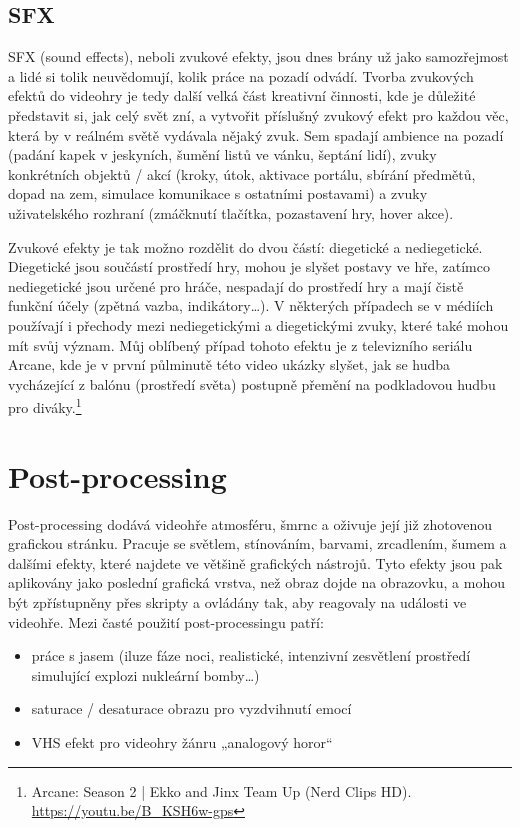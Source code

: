 \subsection{SFX}
SFX (sound effects), neboli zvukové efekty, jsou dnes brány už jako samozřejmost a lidé si tolik neuvědomují, kolik práce na pozadí odvádí. Tvorba zvukových efektů do videohry je tedy další velká část kreativní činnosti, kde je důležité představit si, jak celý svět zní, a vytvořit příslušný zvukový efekt pro každou věc, která by v reálném světě vydávala nějaký zvuk. Sem spadají ambience na pozadí (padání kapek v jeskyních, šumění listů ve vánku, šeptání lidí), zvuky konkrétních objektů / akcí (kroky, útok, aktivace portálu, sbírání předmětů, dopad na zem, simulace komunikace s ostatními postavami) a zvuky uživatelského rozhraní (zmáčknutí tlačítka, pozastavení hry, hover akce).

Zvukové efekty je tak možno rozdělit do dvou částí: diegetické a nediegetické. Diegetické jsou součástí prostředí hry, mohou je slyšet postavy ve hře, zatímco nediegetické jsou určené pro hráče, nespadají do prostředí hry a mají čistě funkční účely (zpětná vazba, indikátory…). V některých případech se v médiích používají i přechody mezi nediegetickými a diegetickými zvuky, které také mohou mít svůj význam. Můj oblíbený případ tohoto efektu je z televizního seriálu Arcane, kde je v první půlminutě této video ukázky slyšet, jak se hudba vycházející z balónu (prostředí světa) postupně přemění na podkladovou hudbu pro diváky.\footnote{Arcane: Season 2 | Ekko and Jinx Team Up (Nerd Clips HD). \url{https://youtu.be/B_KSH6w-gps}}

\section{Post-processing}
Post-processing dodává videohře atmosféru, šmrnc a oživuje její již zhotovenou grafickou stránku. Pracuje se světlem, stínováním, barvami, zrcadlením, šumem a dalšími efekty, které najdete ve většině grafických nástrojů. Tyto efekty jsou pak aplikovány jako poslední grafická vrstva, než obraz dojde na obrazovku, a mohou být zpřístupněny přes skripty a ovládány tak, aby reagovaly na události ve videohře. Mezi časté použití post-processingu patří:

\begin{itemize}
    \item práce s jasem (iluze fáze noci, realistické, intenzivní zesvětlení prostředí simulující explozi nukleární bomby…)
    \item saturace / desaturace obrazu pro vyzdvihnutí emocí
    \item VHS efekt pro videohry žánru „analogový horor“
\end{itemize}